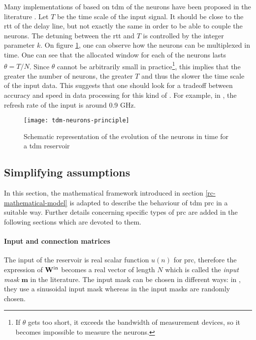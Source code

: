  Many implementations of \rcer based on \gls{tdm} of the neurons have been proposed in the literature \cite{Paquot2012, Antonik2017, Duport2016, Dejonckheere2014, Vandoorne2008, Vinckier2015}. Let $T$ be the time scale of the input signal. It should be close to the \gls{rtt} of the delay line, but not  exactly the same in order to be able to couple the neurons. The detuning between the \gls{rtt} and $T$ is controlled by the integer parameter $k$. On figure \ref{tdm-neurons-principle}, one can observe how the neurons can be multiplexed in time. One can see that the allocated window for each of the neurons lasts $\theta = T/N$. Since $\theta$ cannot be arbitrarily small in practice\footnote{If $\theta$ gets too short, it exceeds the bandwidth of measurement devices, so it becomes impossible to measure the neurons.}, this implies that the greater the number of neurons, the greater $T$ and thus the slower the time scale of the input data. This suggests that one should look for a tradeoff between accuracy and speed in data processing for this kind of \rcer. For example, in \cite{Vinckier2015}, the refresh rate of the input is around 0.9 GHz.
 
 \begin{figure}[h]
 	\centering
 	\texttt{[image: tdm-neurons-principle]}
 	\caption{Schematic representation of the evolution of the neurons in time for a \gls{tdm} reservoir}
 	\label{tdm-neurons-principle}
 \end{figure}
 


\subsection{Simplifying assumptions}

In this section, the mathematical framework introduced in section \ref{rc-mathematical-model} is adapted to describe the behaviour of \gls{tdm} \gls{prc} in a suitable way. Further details concerning specific types of \gls{prc} are added in the following sections which are devoted to them.

\paragraph{Input and connection matrices}

The input of the reservoir is real scalar function $u(n)$ for \gls{prc}, therefore the expression of $\mathbf{W}^{\text{in}}$ becomes a real vector of length $N$ which is called the \textit{input mask} $\mathbf{m}$ in the literature. The input mask can be chosen in different ways: in \cite{Duport2016}, they use a sinusoidal input mask whereas in \cite{Antonik2017, Vinckier2015, Paquot2012} the input masks are randomly chosen.\\

